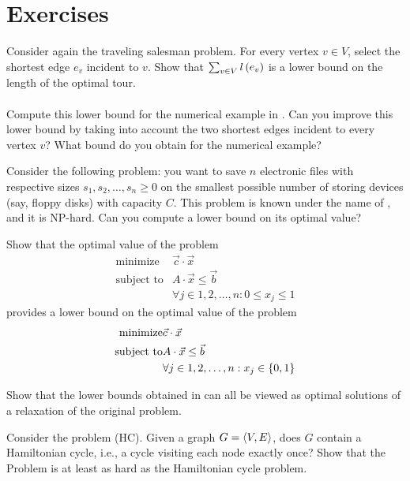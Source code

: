 \section{Exercises}
\begin{exercise}
Consider again the traveling salesman problem. For every vertex $v\in V$, select the shortest edge $e_v$ incident to $v$. Show that $\isumdomain[v]{V}{\fun{l}{e_v}}$ is a lower bound on the length of the optimal tour.
\paragraph{}
Compute this lower bound for the numerical example in . Can you improve this lower bound by taking into account the two shortest edges incident to every vertex $v$? What bound do you obtain for the numerical example?
\end{exercise}
\begin{exercise}
Consider the following problem: you want to save $n$ electronic files with respective sizes $s_1,s_2,\ldots,s_n\geq 0$ on the smallest possible number of storing devices (say, floppy disks) with capacity $C$.
This problem is known under the name of , and it is NP-hard. Can you compute a lower bound on its optimal value?
\end{exercise}
\begin{exercise}
Show that the optimal value of the  problem
\begin{eqnarray}
\mbox{minimize}&\vec{c}\cdot\vec{x}\\
\mbox{subject to}&A\cdot\vec{x}\leq\vec{b}\\
&\forall j\in1,2,\ldots,n:0\leq x_j\leq 1
\end{eqnarray}
provides a lower bound on the optimal value of the  problem
\begin{eqnarray}
\mbox{minimize}&\vec{c}\cdot\vec{x}\\
\mbox{subject to}&A\cdot\vec{x}\leq\vec{b}\\
&\forall j\in1,2,\ldots,n:x_j\in\accl{0,1}
\end{eqnarray}
\end{exercise}
\begin{exercise}
Show that the lower bounds obtained in  can all be viewed as optimal solutions of a relaxation of the original problem.
\end{exercise}
\begin{exercise}
Consider the  problem (HC). Given a graph $G=\tupl{V,E}$, does $G$ contain a Hamiltonian cycle, i.e., a cycle visiting each node exactly once? Show that the  Problem is at least as hard as the Hamiltonian cycle problem.
\end{exercise}
